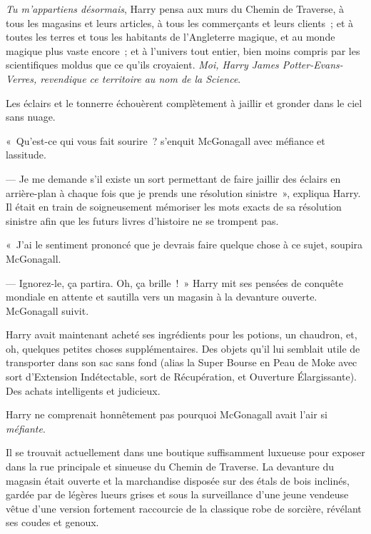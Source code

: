 \emph{Tu m'appartiens désormais}, Harry pensa aux murs du Chemin de Traverse, à tous les magasins et leurs articles, à tous les commerçants et leurs clients~; et à toutes les terres et tous les habitants de l'Angleterre magique, et au monde magique plus vaste encore~; et à l'univers tout entier, bien moins compris par les scientifiques moldus que ce qu'ils croyaient.
\emph{Moi, Harry James Potter-Evans-Verres, revendique ce territoire au nom de la Science}.

Les éclairs et le tonnerre échouèrent complètement à jaillir et gronder dans le ciel sans nuage.

«~Qu'est-ce qui vous fait sourire~? s'enquit McGonagall avec méfiance et lassitude.

--- Je me demande s'il existe un sort permettant de faire jaillir des éclairs en arrière-plan à chaque fois que je prends une résolution sinistre~», expliqua Harry.
Il était en train de soigneusement mémoriser les mots exacts de sa résolution sinistre afin que les futurs livres d'histoire ne se trompent pas.

«~J'ai le sentiment prononcé que je devrais faire quelque chose à ce sujet, soupira McGonagall.

--- Ignorez-le, ça partira. Oh, ça brille~!~» Harry mit ses pensées de conquête mondiale en attente et sautilla vers un magasin à la devanture ouverte. McGonagall suivit.

\later

Harry avait maintenant acheté ses ingrédients pour les potions, un chaudron, et, oh, quelques petites choses supplémentaires.
Des objets qu'il lui semblait utile de transporter dans son sac sans fond (alias la Super Bourse en Peau de Moke  avec sort d'Extension Indétectable, sort de Récupération, et Ouverture Élargissante).
Des achats intelligents et judicieux.

Harry ne comprenait honnêtement pas pourquoi McGonagall avait l'air si \emph{méfiante}.

Il se trouvait actuellement dans une boutique suffisamment luxueuse pour exposer dans la rue principale et sinueuse du Chemin de Traverse.
La devanture du magasin était ouverte et la marchandise disposée sur des étals de bois inclinés, gardée par de légères lueurs grises et sous la surveillance d'une jeune vendeuse vêtue d’une version fortement raccourcie de la classique robe de sorcière, révélant ses coudes et genoux.

